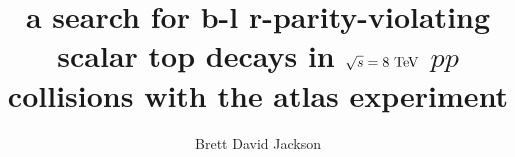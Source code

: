 \title{a search for b-l r-parity-violating scalar top decays
  in $\sqrt{s} = 8 \TeV$ $pp$ collisions with the atlas experiment}
    
\author{Brett David Jackson}

\newcommand{\adviser}{Evelyn Thomson, Associate Professor, Physics}
\newcommand{\advisershort}{Evelyn Thomson}

\newcommand{\myinstitution}{The University of Pennsylvania}

\newcommand{\chairperson}{Marija Drndic, Professor, Physics}

\newcommand{\committeeOne}
    {Gary Bernstein, Professor, Physics}
\newcommand{\committeeTwo}
    {I. Joseph Kroll, Professor, Physics}
\newcommand{\committeeThree}
    {Burt Ovrut, Professor, Physics}
\newcommand{\committeeFour}
    {H.H. Williams, Professor, Physics}



